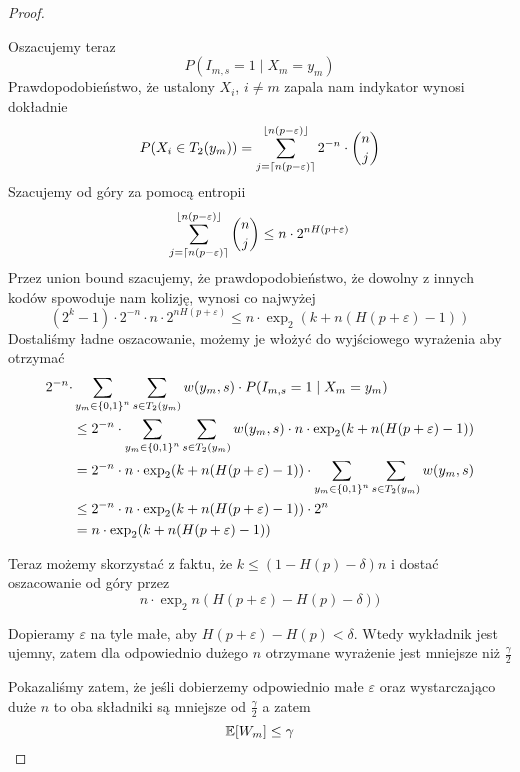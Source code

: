 \begin{proof}
\begin{enumerate}
		      Oszacujemy teraz
		      \[
			      P(I_{m, s} = 1 \mid X_m = y_m)
		      \]
		      Prawdopodobieństwo, że ustalony \( X_i \), \( i \neq m \) zapala nam indykator wynosi dokładnie
		      \[
			      P(X_i \in T_2(y_m)) = \sum_{j = \left\lceil n(p-\varepsilon)\right\rceil}^{\left\lfloor n(p-\varepsilon)\right\rfloor} 2^{-n} \cdot \binom{n}{j}
		      \]
		      Szacujemy od góry za pomocą entropii
		      \[
			      \sum_{j=\left\lceil n(p-\varepsilon)\right\rceil}^{\left\lfloor n(p-\varepsilon)\right\rfloor} \binom{n}{j}
			      \leq n\cdot 2^{nH(p+\varepsilon)}
		      \]
		      Przez union bound szacujemy, że prawdopodobieństwo, że dowolny z innych kodów spowoduje nam kolizję, wynosi co najwyżej
		      \[
			      (2^k-1) \cdot 2^{-n} \cdot n \cdot 2^{nH(p+\varepsilon)}
			      \leq n\cdot\exp_2(k + n(H(p + \varepsilon) - 1))
		      \]
		      Dostaliśmy ładne oszacowanie, możemy je włożyć do wyjściowego wyrażenia aby otrzymać
		      \begin{align*}
			      2^{-n} \cdot & \sum_{y_m \in \set{0, 1}^n} \sum_{s \in T_2(y_m)} w(y_m, s) \cdot P(I_{m, s} = 1 \mid X_m = y_m)                                \\
			                   & \leq 2^{-n}\cdot \sum_{y_m \in \set{0, 1}^n} \sum_{s \in T_2(y_m)} w(y_m, s) \cdot n\cdot \exp_2(k + n(H(p + \varepsilon) - 1)) \\
			                   & =2^{-n} \cdot  n\cdot \exp_2(k + n(H(p + \varepsilon) - 1)) \cdot \sum_{y_m \in \set{0, 1}^n} \sum_{s \in T_2(y_m)} w(y_m, s)   \\
			                   & \leq 2^{-n} \cdot  n\cdot \exp_2(k + n(H(p + \varepsilon) - 1)) \cdot 2^n                                                       \\
			                   & =n\cdot \exp_2(k + n(H(p + \varepsilon) - 1))
		      \end{align*}

		      Teraz możemy skorzystać z faktu, że \( k \leq (1 - H(p) - \delta) n \)
		      i dostać oszacowanie od góry przez
		      \[
			      n\cdot \exp_2n(H(p + \varepsilon) - H(p) - \delta))
		      \]

		      Dopieramy \( \varepsilon \) na tyle małe, aby \( H(p + \varepsilon) - H(p) < \delta \). Wtedy wykładnik jest ujemny, zatem dla odpowiednio dużego \( n \) otrzymane wyrażenie jest mniejsze niż \( \frac{\gamma}{2} \)

	\end{enumerate}
	Pokazaliśmy zatem, że jeśli dobierzemy odpowiednio małe \( \varepsilon \)
	oraz wystarczająco duże \( n \)
	to oba składniki są mniejsze od \( \frac{\gamma}{2} \)
	a zatem
	\[
		\expected{W_m} \leq \gamma
	\]


\end{proof}
